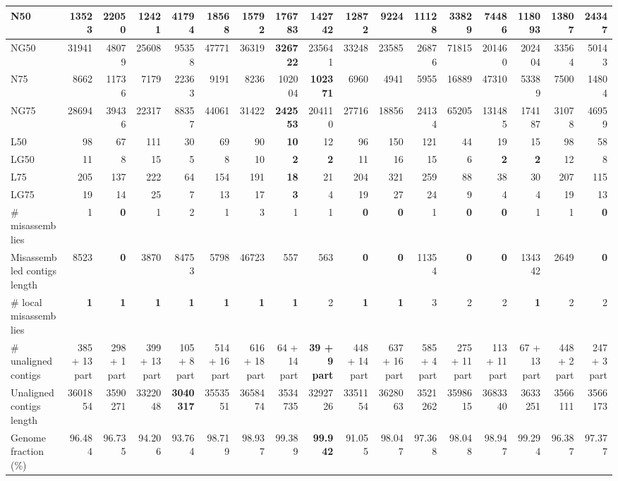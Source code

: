\documentclass[12pt,a4paper]{article}
\begin{document}
\begin{table}[ht]
\begin{center}
\begin{tabular}{|l*{16}{|r}|}
N50 & 13523 & 22050 & 12421 & 41794 & 18568 & 15792 & {\bf 176783} & 142742 & 12872 & 9224 & 11128 & 33829 & 74486 & 118093 & 13807 & 24347 \\ \hline
NG50 & 31941 & 48079 & 25608 & 95358 & 47771 & 36319 & {\bf 326722} & 235641 & 33248 & 23585 & 26876 & 71815 & 201460 & 202404 & 33564 & 50143 \\ \hline
N75 & 8662 & 11736 & 7179 & 22363 & 9191 & 8236 & 102004 & {\bf 102371} & 6960 & 4941 & 5955 & 16889 & 47310 & 53389 & 7500 & 14804 \\ \hline
NG75 & 28694 & 39436 & 22317 & 88357 & 44061 & 31422 & {\bf 242553} & 204110 & 27716 & 18856 & 24134 & 65205 & 131485 & 174187 & 31078 & 46959 \\ \hline
L50 & 98 & 67 & 111 & 30 & 69 & 90 & {\bf 10} & 12 & 96 & 150 & 121 & 44 & 19 & 15 & 98 & 58 \\ \hline
LG50 & 11 & 8 & 15 & 5 & 8 & 10 & {\bf 2} & {\bf 2} & 11 & 16 & 15 & 6 & {\bf 2} & {\bf 2} & 12 & 8 \\ \hline
L75 & 205 & 137 & 222 & 64 & 154 & 191 & {\bf 18} & 21 & 204 & 321 & 259 & 88 & 38 & 30 & 207 & 115 \\ \hline
LG75 & 19 & 14 & 25 & 7 & 13 & 17 & {\bf 3} & 4 & 19 & 27 & 24 & 9 & 4 & 4 & 19 & 13 \\ \hline
\# misassemblies & 1 & {\bf 0} & 1 & 2 & 1 & 3 & 1 & 1 & {\bf 0} & {\bf 0} & 1 & {\bf 0} & {\bf 0} & 1 & 1 & {\bf 0} \\ \hline
Misassembled contigs length & 8523 & {\bf 0} & 3870 & 84753 & 5798 & 46723 & 557 & 563 & {\bf 0} & {\bf 0} & 11354 & {\bf 0} & {\bf 0} & 134342 & 2649 & {\bf 0} \\ \hline
\# local misassemblies & {\bf 1} & {\bf 1} & {\bf 1} & {\bf 1} & {\bf 1} & {\bf 1} & {\bf 1} & 2 & {\bf 1} & {\bf 1} & 3 & 2 & 2 & {\bf 1} & 2 & 2 \\ \hline
\# unaligned contigs & 385 + 13 part & 298 + 1 part & 399 + 13 part & 105 + 8 part & 514 + 16 part & 616 + 18 part & 64 + 14 part & {\bf 39 + 9 part} & 448 + 14 part & 637 + 16 part & 585 + 4 part & 275 + 11 part & 113 + 11 part & 67 + 13 part & 448 + 2 part & 247 + 3 part \\ \hline
Unaligned contigs length & 3601854 & 3590271 & 3322048 & {\bf 3040317} & 3553551 & 3658474 & 3534735 & 3292726 & 3351154 & 3628063 & 3521262 & 3598615 & 3683340 & 3633251 & 3566111 & 3566173 \\ \hline
Genome fraction (\%) & 96.484 & 96.735 & 94.206 & 93.764 & 98.719 & 98.937 & 99.389 & {\bf 99.942} & 91.055 & 98.047 & 97.368 & 98.048 & 98.947 & 99.294 & 96.387 & 97.377 \\ \hline

\end{tabular}
\end{center}
\end{table}
\end{document}
